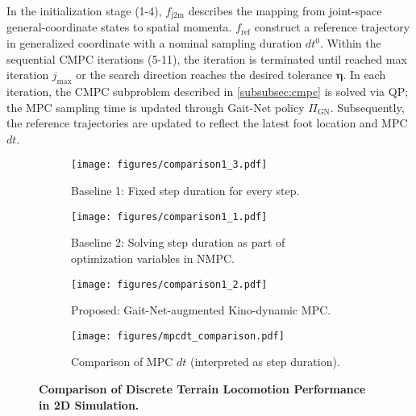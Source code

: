 In the initialization stage (1-4), $f_\text{j2m}$ describes the mapping from joint-space general-coordinate states to spatial momenta. $f_\text{ref}$ construct a reference trajectory in generalized coordinate with a nominal sampling duration $dt^0$. Within the sequential CMPC iterations (5-11), the iteration is terminated until reached max iteration $j_\text{max}$ or the search direction reaches the desired tolerance $\bm \eta$. In each iteration, the CMPC subproblem described in \ref{subsubsec:cmpc} is solved via QP; the MPC sampling time is updated through Gait-Net policy $\Pi_\text{GN}$. Subsequently, the reference trajectories are updated to reflect the latest foot location and MPC $dt$. 

\begin{figure}[!t]
\vspace{0.2cm}
     \centering
     \begin{subfigure}[b]{0.5\textwidth}
         \centering
	   \texttt{[image: figures/comparison1\_3.pdf]}
          \caption{Baseline 1: Fixed step duration for every step.}
          \vspace{0.2cm}
          \label{fig:comp1_3}
     \end{subfigure}
     \begin{subfigure}[b]{0.5\textwidth}
        \texttt{[image: figures/comparison1\_1.pdf]}
	\caption{Baseline 2: Solving step duration as part of optimization variables in NMPC.}
        \vspace{0.2cm}
	\label{fig:comp1_1}
     \end{subfigure}
     \begin{subfigure}[b]{0.5\textwidth}
         \centering
	   \texttt{[image: figures/comparison1\_2.pdf]}
          \caption{Proposed: Gait-Net-augmented Kino-dynamic MPC.}
          \vspace{0.4cm}
          \label{fig:comp1_2}
     \end{subfigure}
     \begin{subfigure}[b]{0.48\textwidth}
         \centering
	   \texttt{[image: figures/mpcdt\_comparison.pdf]}
          \caption{Comparison of MPC $dt$ (interpreted as step duration).}
          \label{fig:dt_comp}
     \end{subfigure}
     \caption{{\bfseries{Comparison of Discrete Terrain Locomotion Performance in 2D Simulation.}} }
        \label{fig:comp1}
\end{figure}

